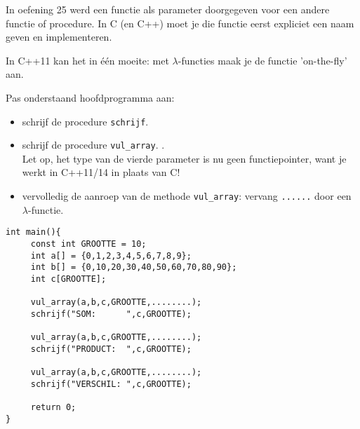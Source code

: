 
\beginoef
In oefening 25 werd een functie als parameter doorgegeven voor een andere functie of procedure. In C (en C++) moet je die functie eerst expliciet een naam geven en implementeren.

In C++11 kan het in \'e\'en moeite: met $\lambda$-functies maak je de functie 'on-the-fly' aan.

Pas onderstaand hoofdprogramma aan: 
\begin{itemize}
\item schrijf de procedure \verb}schrijf}.
\item schrijf de procedure \verb}vul_array}. .
\\Let op, het type van de vierde parameter is nu geen functiepointer, want je werkt in C++11/14 in plaats van C!
\item vervolledig de aanroep van de methode \verb}vul_array}: vervang \verb}......} door een  $\lambda$-functie. 

\end{itemize}
\begin{footnotesize}
\begin{verbatim}
int main(){
     const int GROOTTE = 10;
     int a[] = {0,1,2,3,4,5,6,7,8,9};
     int b[] = {0,10,20,30,40,50,60,70,80,90};
     int c[GROOTTE];
          
     vul_array(a,b,c,GROOTTE,........);
     schrijf("SOM:      ",c,GROOTTE);

     vul_array(a,b,c,GROOTTE,........);
     schrijf("PRODUCT:  ",c,GROOTTE);

     vul_array(a,b,c,GROOTTE,........);
     schrijf("VERSCHIL: ",c,GROOTTE);
     
     return 0;
}
\end{verbatim}
\end{footnotesize}
\endoef
